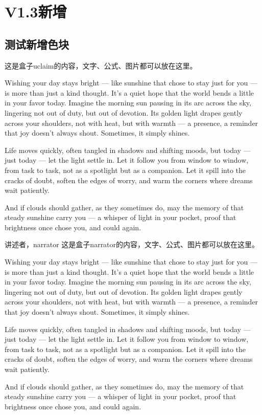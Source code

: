 \section{V1.3新增}
\subsection{测试新增色块}
\begin{uclaim}
	这是盒子uclaim的内容，文字、公式、图片都可以放在这里。
	
	Wishing your day stays bright — like sunshine that chose to stay just for you — is more than just a kind thought. It’s a quiet hope that the world bends a little in your favor today. Imagine the morning sun pausing in its arc across the sky, lingering not out of duty, but out of devotion. Its golden light drapes gently across your shoulders, not with heat, but with warmth — a presence, a reminder that joy doesn’t always shout. Sometimes, it simply shines.
	
	Life moves quickly, often tangled in shadows and shifting moods, but today — just today — let the light settle in. Let it follow you from window to window, from task to task, not as a spotlight but as a companion. Let it spill into the cracks of doubt, soften the edges of worry, and warm the corners where dreams wait patiently.
	
	And if clouds should gather, as they sometimes do, may the memory of that steady sunshine carry you — a whisper of light in your pocket, proof that brightness once chose you, and could again.
\end{uclaim}

\begin{narrator}{讲述者，narrator}
	这是盒子narrator的内容，文字、公式、图片都可以放在这里。
	
	Wishing your day stays bright — like sunshine that chose to stay just for you — is more than just a kind thought. It’s a quiet hope that the world bends a little in your favor today. Imagine the morning sun pausing in its arc across the sky, lingering not out of duty, but out of devotion. Its golden light drapes gently across your shoulders, not with heat, but with warmth — a presence, a reminder that joy doesn’t always shout. Sometimes, it simply shines.
	
	Life moves quickly, often tangled in shadows and shifting moods, but today — just today — let the light settle in. Let it follow you from window to window, from task to task, not as a spotlight but as a companion. Let it spill into the cracks of doubt, soften the edges of worry, and warm the corners where dreams wait patiently.
	
	And if clouds should gather, as they sometimes do, may the memory of that steady sunshine carry you — a whisper of light in your pocket, proof that brightness once chose you, and could again.
\end{narrator}

